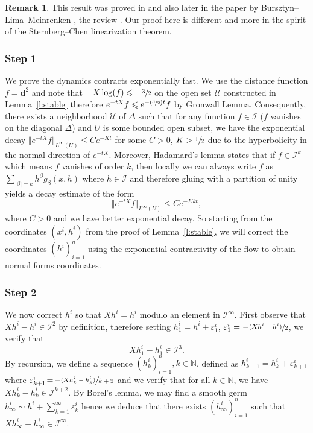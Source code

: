\documentclass[10pt]{amsart}
\let\pazocal\mathscr
\newcommand{\Psfrac}[2]{(\sfrac{#1}{#2})}
\theoremstyle{definition}
\newtheorem{remark}[theorem]{Remark}
\let\euler X
\newcommand{\step}[1]{\subsubsection*{Step #1}}
\begin{document}
\begin{remark}
This result was proved in \cite{dangthesis} and also later
in the paper by Bursztyn--Lima--Meinrenken \cite{Bursztyn2019}, \cf the review \cite{Meinrenken2021}. Our proof here is different and more in the spirit of the Sternberg--Chen linearization theorem.
\end{remark}

\step{1}
We prove the dynamics contracts exponentially fast. We use the distance function $f=\mathbf{d}^2$ and note that
$-\euler \log(f)\leqslant -\sfrac{3}{2} $ on the open set $\pazocal{U}$ constructed in Lemma~\ref{l:stable} therefore
$ e^{-t\euler}f\leqslant e^{-\Psfrac{3}{2}t}f $ by Gronwall Lemma.
Consequently, there exists a neighborhood $\pazocal{U}$ of $\Delta$ such that for any function $f\in \pazocal{I}$ ($f$ vanishes on
the diagonal $\Delta$) and $U$ is some bounded open subset, we have the exponential decay
$\Vert e^{-t\euler}f\Vert_{L^\infty(U)} \leqslant C e^{-Kt}
$ for some $C>0$, $K>\sfrac{1}{2}$ due to the hyperbolicity
in the normal direction of $e^{-t\euler}$.
Moreover, Hadamard's lemma states that if $f\in \pazocal{I}^k$ which means $f$ vanishes of order $k$, then
locally we can always write
$f$ as $\sum_{\vert \beta\vert = k} h^\beta g_\beta(x,h) $
where $h\in \pazocal{I}$ and therefore gluing with a partition of unity
yields a decay estimate of the form
\[
\Vert e^{-t\euler}f\Vert_{L^\infty(U)} \leqslant C e^{-Kkt},
\]
where $C>0$ and we have better exponential decay.
So starting from the coordinates $(x^i,h^i)$ from {the proof of Lemma~\ref{l:stable}}, we will correct the coordinates
$(h^i)_{i=1}^n$ using the exponential contractivity of the flow
to obtain normal forms coordinates.

\step{2}
We now correct $h^i$ so that
$\euler h^i=h^i$ modulo an element in $\pazocal{I}^\infty$.
First observe that $\euler h^i-h^i\in \pazocal{I}^2$ by definition, therefore
setting $ h_1^i= h^i +\varepsilon^i_1$, $\varepsilon^i_1= -\sfrac{(\euler h^i-h^i)}{2} $, we verify that
\[
\euler h_1^i-h_1^i \in \pazocal{I}^3.
\]
By recursion, we define a sequence $(h_k^i)_{i=1}^n, k\in \mathbb{N}$,
defined as
$h_{k+1}^i=h_k^i+\varepsilon_{k+1}^i$
where $\varepsilon_{k+1}^i\!=\! -\sfrac{(\euler h^i_k-h^i_k)}{k+2} $
and we verify that for all $k\!\in\! \mathbb{N}$, we have $ \euler h_k^i-h_k^i \!\in\! \pazocal{I}^{k+2}$.
By Borel's lemma, we may find a smooth germ
$h_\infty^i\sim h^i + \sum_{k=1}^\infty \varepsilon_k^i $ hence we
deduce that there exists $(h_\infty^i)_{i=1}^n$ such that
$ \euler h_\infty^i-h_\infty^i \in \pazocal{I}^\infty $.
\end{document}
